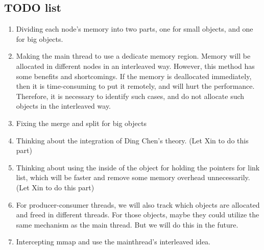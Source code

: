 \subsection{TODO list}

\begin{enumerate}
\item Dividing each node's memory into two parts, one for small objects, and one for big objects. 
\item Making the main thread to use a dedicate memory region. Memory will be allocated in different nodes in an interleaved way. However, this method has some benefits and shortcomings. If the memory is deallocated immediately, then it is time-consuming to put it remotely, and will hurt the performance. Therefore, it is necessary to identify such cases, and do not allocate such objects in the interleaved way. 
\item Fixing the merge and split for big objects
\item Thinking about the integration of Ding Chen's theory. (Let Xin to do this part)
\item Thinking about using the inside of the object for holding the pointers for link list, which will be faster and remove some memory overhead unnecessarily. (Let Xin to do this part)
\item For producer-consumer threads, we will also track which objects are allocated and freed in different threads. For those objects, maybe they could utilize the same mechanism as the main thread. But we will do this in the future.
\item Intercepting mmap and use the mainthread's interleaved idea. 

	
\end{enumerate}

